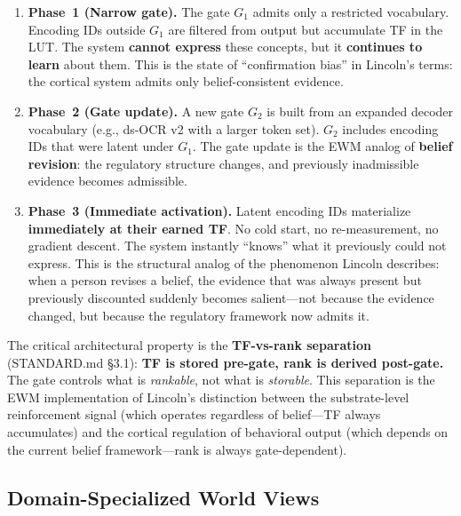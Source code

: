 \documentclass[11pt,a4paper]{article}
\theoremstyle{remark}
\begin{document}
\begin{enumerate}[leftmargin=*,nosep]
  \item \textbf{Phase~1 (Narrow gate).} The gate $G_1$ admits only a
    restricted vocabulary. Encoding IDs outside $G_1$ are filtered from output
    but accumulate TF in the LUT. The system \textbf{cannot express} these
    concepts, but it \textbf{continues to learn} about them. This is the state
    of ``confirmation bias'' in Lincoln's terms: the cortical system admits
    only belief-consistent evidence.
  \item \textbf{Phase~2 (Gate update).} A new gate $G_2$ is built from an
    expanded decoder vocabulary (e.g., ds-OCR v2 with a larger token set).
    $G_2$ includes encoding IDs that were latent under $G_1$. The gate update
    is the EWM analog of \textbf{belief revision}: the regulatory structure
    changes, and previously inadmissible evidence becomes admissible.
  \item \textbf{Phase~3 (Immediate activation).} Latent encoding IDs
    materialize \textbf{immediately at their earned TF}. No cold start, no
    re-measurement, no gradient descent. The system instantly ``knows'' what it
    previously could not express. This is the structural analog of the
    phenomenon Lincoln describes: when a person revises a belief, the evidence
    that was always present but previously discounted suddenly becomes
    salient---not because the evidence changed, but because the regulatory
    framework now admits it.
\end{enumerate}

The critical architectural property is the \textbf{TF-vs-rank separation}
(STANDARD.md \S3.1): \textbf{TF is stored pre-gate, rank is derived
post-gate.} The gate controls what is \textit{rankable}, not what is
\textit{storable}. This separation is the EWM implementation of Lincoln's
distinction between the substrate-level reinforcement signal (which operates
regardless of belief---TF always accumulates) and the cortical regulation of
behavioral output (which depends on the current belief framework---rank is
always gate-dependent).

\subsection{Domain-Specialized World Views}
\label{sec:cortex-domains}
\end{document}
